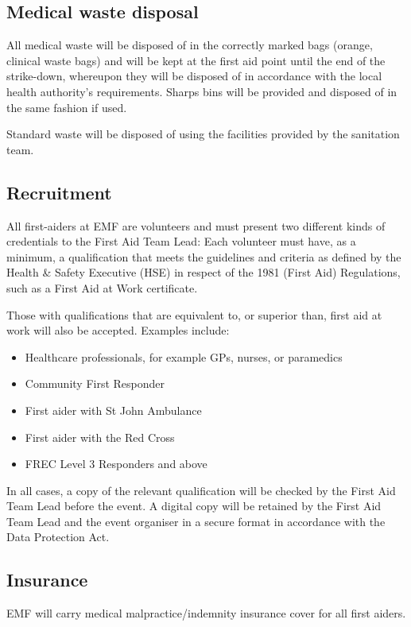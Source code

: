 \subsection{Medical waste disposal}
All medical waste will be disposed of in the correctly marked bags (orange,
clinical waste bags) and will be kept at the first aid point until the end of
the strike-down, whereupon they will be disposed of in accordance with the
local health authority's requirements. Sharps bins will be provided and
disposed of in the same fashion if used.

Standard waste will be disposed of using the facilities provided by the sanitation team.

\subsection{Recruitment}
All first-aiders at EMF are volunteers and must present two different kinds of
credentials to the First Aid Team Lead: Each volunteer must have, as a minimum,
a qualification that meets the guidelines and criteria as defined by the Health
\& Safety Executive (HSE) in respect of the 1981 (First Aid) Regulations, such
as a First Aid at Work certificate.

Those with qualifications that are equivalent to, or superior than,
first aid at work will also be accepted. Examples include:

\begin{itemize}
 \tightlist
  \item Healthcare professionals, for example GPs, nurses, or paramedics
  \item Community First Responder
  \item First aider with St John Ambulance
  \item First aider with the Red Cross
  \item FREC Level 3 Responders and above
\end{itemize}

In all cases, a copy of the relevant qualification will be checked by the
First Aid Team Lead before the event. A digital copy will be retained by the
First Aid Team Lead and the event organiser in a secure format in accordance
with the Data Protection Act.

\subsection{Insurance}
EMF will carry medical malpractice/indemnity insurance cover for all first aiders.

